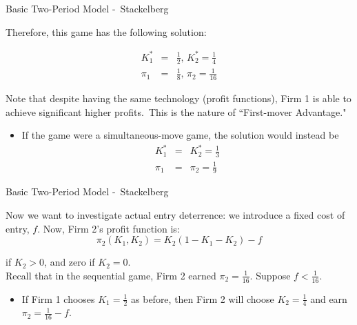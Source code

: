 \begin{frame}{Basic Two-Period Model -\ Stackelberg}


Therefore, this game has the following solution: 

\begin{eqnarray*}
K_{1}^{\ast } &=&\frac{1}{2}\text{, }K_{2}^{\ast }=\frac{1}{4} \\
\pi_{1} &=&\frac{1}{8}\text{, }\pi_{2}=\frac{1}{16}
\end{eqnarray*}

Note that despite having the same technology (profit functions), Firm 1 is
able to achieve significant higher profits.\ This is the nature of
``First-mover Advantage."

\begin{itemize}
\item If the game were a simultaneous-move game, the solution would instead
be 
\begin{eqnarray*}
K_{1}^{\ast } &=&K_{2}^{\ast }=\frac{1}{3} \\
\pi_{1} &=&\pi_{2}=\frac{1}{9}
\end{eqnarray*}
\end{itemize}

\end{frame}%

\begin{frame}{Basic Two-Period Model -\ Stackelberg}


Now we want to investigate actual entry deterrence: we introduce a
fixed cost of entry, $f$. Now, Firm 2's profit function is:\\

\begin{equation*}
\pi_{2}( K_{1},K_{2}) = K_{2}(1-K_{1}-K_{2}) - f 
\end{equation*}

if $K_{2}>0$, and zero if $K_{2}=0$.\\
\vspace{0.2in}
Recall that in the sequential game, Firm 2 earned $\pi_{2}=\frac{1}{16}$.
Suppose $f<\frac{1}{16}$.

\begin{itemize}
\item If Firm 1 chooses $K_{1}=\frac{1}{2}$ as before, then Firm 2 will
choose $K_{2}=\frac{1}{4}$ and earn $\pi_{2}=\frac{1}{16}-f$. 
\end{itemize}

\end{frame}%


